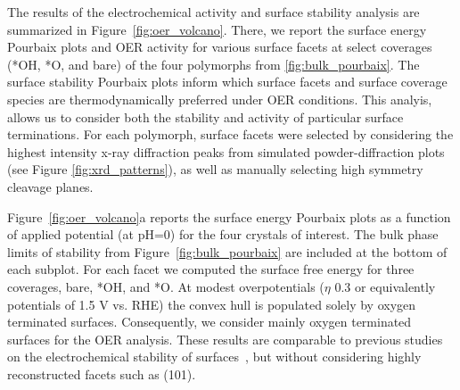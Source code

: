 % 
%
The results of the electrochemical activity and surface stability analysis are summarized in Figure~\ref{fig:oer_volcano}.
%
There, we report the surface energy Pourbaix plots and OER activity for various surface facets at select coverages (*OH, *O, and bare) of the four \IrOx polymorphs from \ref{fig:bulk_pourbaix}.
%
The surface stability Pourbaix plots inform which surface facets and surface coverage species are thermodynamically preferred under OER conditions.
%
This analyis, allows us to consider both the stability and activity of particular surface terminations.
%
For each polymorph, surface facets were selected by considering the highest intensity x-ray diffraction peaks from simulated powder-diffraction plots~\cite{Momma2011} (see Figure \ref{fig:xrd_patterns}),
as well as manually selecting high symmetry cleavage planes.


%
%
Figure~\ref{fig:oer_volcano}a reports the surface energy Pourbaix plots as a function of applied potential (at pH\num{=0}) for the four \IrOx crystals of interest.
%
The bulk phase limits of stability from Figure~\ref{fig:bulk_pourbaix} are included at the bottom of each subplot.
%
For each facet we computed the surface free energy for three coverages, bare, *OH, and *O.
%
At modest overpotentials ($\eta$ \mytilde\num{0.3} or equivalently potentials of \mytilde\num{1.5} V vs. RHE) the convex hull is populated solely by oxygen terminated surfaces.
%
Consequently, we consider mainly oxygen terminated surfaces for the OER analysis.
%
These results are comparable to previous studies on the electrochemical stability of \IrOtwo surfaces~\cite{Nattino2019}, but without considering highly reconstructed facets such as (101).


